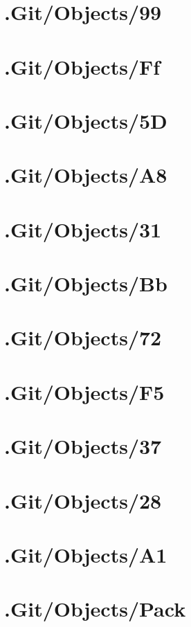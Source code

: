 \section*{.Git/Objects/99}

\section*{.Git/Objects/Ff}

\section*{.Git/Objects/5D}

\section*{.Git/Objects/A8}

\section*{.Git/Objects/31}

\section*{.Git/Objects/Bb}

\section*{.Git/Objects/72}

\section*{.Git/Objects/F5}

\section*{.Git/Objects/37}

\section*{.Git/Objects/28}

\section*{.Git/Objects/A1}

\section*{.Git/Objects/Pack}

